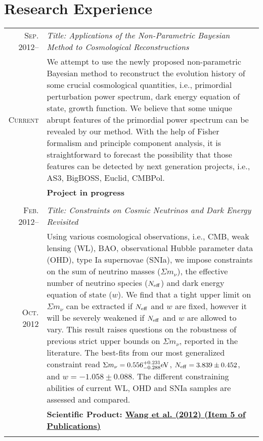 \documentclass[10pt]{article}
\begin{document}
\section{Research Experience}
\vspace{-1ex}
\begin{longtable}{r|p{17cm}}
\textsc{Sep. 2012}--	&   \emph{Title: Applications of the Non-Parametric Bayesian Method to Cosmological Reconstructions}	\\
\textsc{Current}  &   \small{We attempt to use the newly proposed non-parametric Bayesian method to
reconstruct the evolution history of some crucial cosmological quantities, i.e., primordial perturbation power spectrum, dark energy equation of state, growth function. We believe that some unique abrupt features of the primordial power spectrum can be revealed by our method. With the help of Fisher formalism and principle component analysis, it is straightforward to forecast the possibility that those features can be detected by next generation projects, i.e., AS3, BigBOSS, Euclid, CMBPol. %
}	\\
&   \textbf{Project in progress} \\
\multicolumn{2}{c}{} \\

\textsc{Feb. 2012}--    &   \emph{Title: Constraints on Cosmic Neutrinos and Dark Energy Revisited}  \\
\textsc{Oct. 2012}  &   \small{Using various cosmological observations, i.e., CMB, weak lensing (WL), BAO, observational Hubble parameter data (OHD), type Ia supernovae (SNIa), we impose constraints on the sum of neutrino masses ($\Sigma m_{\nu}$), the effective number of neutrino species ($N_{\rm eff}$) and dark energy equation of state ($w$). We find that a tight upper limit on $\Sigma m_{\nu}$ can be extracted if $N_{\rm eff}$ and $w$ are fixed, however it will be severely weakened if $N_{\rm eff}$ and $w$ are allowed to vary. This result raises questions on the robustness of previous strict upper bounds on $\Sigma m_{\nu}$, reported in the literature. The best-fits from our most generalized constraint read $\Sigma m_{\nu}=0.556^{+0.231}_{-0.288}\rm eV$, $N_{\rm eff}=3.839\pm0.452$, and $w=-1.058\pm0.088$. The different constraining abilities of current WL, OHD and SNIa samples are assessed and compared.}\\
&   \textbf{Scientific Product: \hyperlink{5}{Wang et al. (2012) (Item 5 of Publications)}}  \\
\multicolumn{2}{c}{} \\


\end{longtable}
\end{document}
